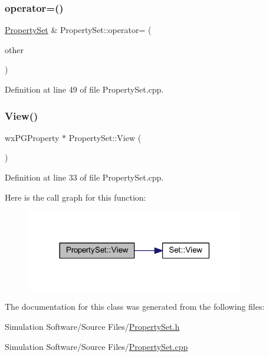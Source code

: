 \subsubsection{\texorpdfstring{operator=()}{operator=()}}
{\footnotesize\ttfamily \hyperlink{class_property_set}{Property\+Set} \& Property\+Set\+::operator= (\begin{DoxyParamCaption}\item[{const \hyperlink{class_property_set}{Property\+Set} \&}]{other }\end{DoxyParamCaption})}



Definition at line 49 of file Property\+Set.\+cpp.

\mbox{\label{class_property_set_a3838d3ec98d411f46cd22633b48ca091}} 
\subsubsection{\texorpdfstring{View()}{View()}}
{\footnotesize\ttfamily wx\+P\+G\+Property $\ast$ Property\+Set\+::\+View (\begin{DoxyParamCaption}{ }\end{DoxyParamCaption})}



Definition at line 33 of file Property\+Set.\+cpp.

Here is the call graph for this function\+:\nopagebreak
\begin{figure}[H]
\begin{center}
\leavevmode
\includegraphics[width=270pt]{class_property_set_a3838d3ec98d411f46cd22633b48ca091_cgraph}
\end{center}
\end{figure}


The documentation for this class was generated from the following files\+:\begin{DoxyCompactItemize}
\item 
Simulation Software/\+Source Files/\hyperlink{_property_set_8h}{Property\+Set.\+h}\item 
Simulation Software/\+Source Files/\hyperlink{_property_set_8cpp}{Property\+Set.\+cpp}\end{DoxyCompactItemize}
